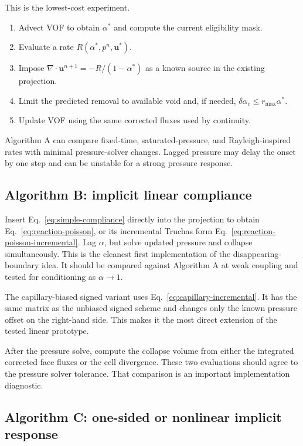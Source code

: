 \documentclass[11pt]{article}
\newcommand{\divg}{\nabla\!\cdot}
\newcommand{\uv}{\boldsymbol{u}}
\begin{document}
This is the lowest-cost experiment.
\begin{enumerate}
  \item Advect VOF to obtain \(\alpha^*\) and compute the current eligibility mask.
  \item Evaluate a rate \(R(\alpha^*,p^n,\uv^*)\).
  \item Impose \(\divg\uv^{n+1}=-R/(1-\alpha^*)\) as a known source in the existing
        projection.
  \item Limit the predicted removal to available void and, if needed,
        \(\delta\alpha_c\le r_{\max}\alpha^*\).
  \item Update VOF using the same corrected fluxes used by continuity.
\end{enumerate}
Algorithm A can compare fixed-time, saturated-pressure, and Rayleigh-inspired rates with
minimal pressure-solver changes.  Lagged pressure may delay the onset by one step and can
be unstable for a strong pressure response.

\subsection{Algorithm B: implicit linear compliance}

Insert Eq.~\eqref{eq:simple-compliance} directly into the projection to obtain
Eq.~\eqref{eq:reaction-poisson}, or its incremental Truchas form
Eq.~\eqref{eq:reaction-poisson-incremental}.  Lag \(\alpha\), but solve updated pressure
and collapse simultaneously.  This is the cleanest first implementation of the
disappearing-boundary idea.  It should be compared against Algorithm A at weak coupling
and tested for conditioning as \(\alpha\to1\).

The capillary-biased signed variant uses Eq.~\eqref{eq:capillary-incremental}.  It has
the same matrix as the unbiased signed scheme and changes only the known pressure offset
on the right-hand side.  This makes it the most direct extension of the tested linear
prototype.

After the pressure solve, compute the collapse volume from either the integrated corrected
face fluxes or the cell divergence.  These two evaluations should agree to the pressure
solver tolerance.  That comparison is an important implementation diagnostic.

\subsection{Algorithm C: one-sided or nonlinear implicit response}
\end{document}
